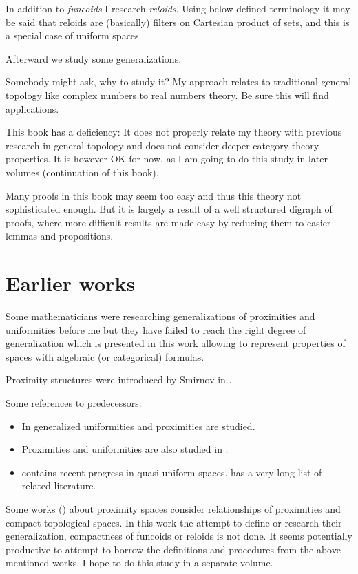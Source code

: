 In addition to \emph{funcoids} I research \emph{reloids}. Using below
defined terminology it may be said that reloids are (basically) filters
on Cartesian product of sets, and this is a special case of uniform
spaces.

Afterward we study some generalizations.

Somebody might ask, why to study it? My approach relates to traditional
general topology like complex numbers to real numbers theory. Be sure
this will find applications.

This book has a deficiency: It does not properly relate my theory
with previous research in general topology and does not consider deeper
category theory properties. It is however OK for now, as I am going
to do this study in later volumes (continuation of this book).

Many proofs in this book may seem too easy and thus this theory not
sophisticated enough. But it is largely a result of a well structured
digraph of proofs, where more difficult results are made easy by reducing
them to easier lemmas and propositions.


\section{Earlier works}

Some mathematicians were researching generalizations of proximities
and uniformities before me but they have failed to reach the right
degree of generalization which is presented in this work allowing
to represent properties of spaces with algebraic (or categorical)
formulas.

Proximity structures were introduced by Smirnov in \cite{geom-prox}.

Some references to predecessors:
\begin{itemize}
\item In \cite{gen-prox-uni1,gen-prox-uni2,some-props-prox-genunif,prox-gen-unif,compl-unif-prox}
generalized uniformities and proximities are studied.
\item Proximities and uniformities are also studied in \cite{complete-prox,prox-not-compl,compl-prox-acad,compl-prox1,compl-prox2}.
\item \cite{qunif,qunif2001} contains recent progress in quasi-uniform
spaces. \cite{qunif2001} has a very long list of related literature.
\end{itemize}
Some works (\cite{on-proximity-spaces}) about proximity spaces consider
relationships of proximities and compact topological spaces. In this
work the attempt to define or research their generalization, compactness
of funcoids or reloids is not done. It seems potentially productive
to attempt to borrow the definitions and procedures from the above
mentioned works. I hope to do this study in a separate volume.

